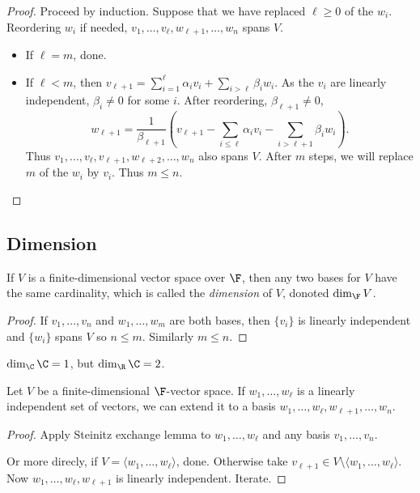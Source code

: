 \documentclass[a4paper]{article}
\theoremstyle{definition}
\begin{document}
\begin{proof}
  Proceed by induction. Suppose that we have replaced $\ell \geq 0$ of the $w_i$. Reordering $w_i$ if needed, $v_1,\ldots,v_\ell,w_{\ell+1},\ldots,w_n$ spans $V$.
  \begin{itemize}
  \item If $\ell = m$, done.
  \item If $\ell < m$, then $v_{\ell+1} = \sum_{i=1}^\ell \alpha_i v_i + \sum_{i> \ell} \beta_i w_i$. As the $v_i$ are linearly independent, $\beta_i \neq 0$ for some $i$. After reordering, $\beta_{\ell+1} \neq 0$,
    \[
      w_{\ell+1} = \frac{1}{\beta_{\ell+1}} (v_{\ell+1}-\sum_{i\leq \ell} \alpha_i v_i - \sum_{i>\ell+1} \beta_i w_i).
    \]
    Thus $v_1,\ldots, v_\ell, v_{\ell+1},w_{\ell+2},\ldots, w_n$ also spans $V$. After $m$ steps, we will replace $m$ of the $w_i$ by $v_i$. Thus $m \leq n$.
  \end{itemize}
\end{proof}

\subsection{Dimension}

\begin{theorem}
  If $V$ is a finite-dimensional vector space over $\F$, then any two bases for $V$ have the same cardinality, which is called the \emph{dimension} of $V$, donoted $\dim_\F V$.
\end{theorem}

\begin{proof}
  If $v_1,\ldots, v_n$ and $w_1,\ldots,w_m$ are both bases, then $\{v_i\}$ is linearly independent and $\{w_i\}$ spans $V$ so $n \leq m$. Similarly $m \leq n$.
\end{proof}

\begin{eg}
  $\dim_\C \C = 1$, but $\dim_\R \C = 2$.
\end{eg}

\begin{lemma}
  Let \(V\) be a finite-dimensional \(\F\)-vector space. If \(w_1,\ldots,w_\ell\) is a linearly independent set of vectors, we can extend it to a basis \(w_1,\ldots,w_\ell,w_{\ell+1},\ldots,w_n\).
\end{lemma}

\begin{proof}
  Apply Steinitz exchange lemma to \(w_1,\ldots, w_\ell\) and any basis \(v_1,\ldots, v_n\).

  Or more direcly, if \(V=\langle w_1,\ldots, w_\ell \rangle\), done. Otherwise take \(v_{\ell+1} \in V\setminus\langle w_1,\ldots, w_\ell\rangle\). Now \(w_1,\ldots, w_\ell,w_{\ell+1}\) is linearly independent. Iterate.
\end{proof}
\end{document}
